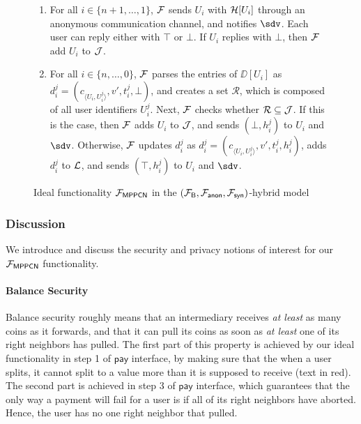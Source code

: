 \begin{figure*}[!t]
{{\begin{enumerate}
	\item For all $i \in \{n+1,\ldots,1\}$, $\mathcal{F}$ sends $U_i$ with $\mathcal{H}[U_i]$ through an 
	anonymous communication channel, and notifies $\sdv$. Each user can reply either with 
	$\top$ or $\bot$. If $U_i$ replies with $\bot$, then $\mathcal{F}$ add $U_i$ to $\mathcal{J}$.
	
	\item For all $i \in \{n,\ldots,0\}$, $\mathcal{F}$ parses the entries of $\DD[U_i]$ as 
	$d_i^j = (c_{\langle U_i,U_i^j \rangle}, v', t_i^j, \bot)$, and creates a set 
	$\mathcal{R}$, which is composed of all user identifiers $U_i^j$. Next, $\mathcal{F}$ checks 
	whether $\mathcal{R} \subseteq \mathcal{J}$. If this is the case, then $\mathcal{F}$ adds $U_i$ to $\mathcal{J}$, 
	and sends $(\bot, h_i^j)$ to $U_i$ and $\sdv$. Otherwise, $\mathcal{F}$ updates $d_i^j$ as 
	$d_i^j = (c_{\langle U_i,U_i^j \rangle}, v', t_i^j, h_i^j)$, adds $d_i^j$ to $\mathcal{L}$, and 
	sends $(\top, h_i^j)$ to $U_i$ and $\sdv$.
\end{enumerate}
}}

\caption{Ideal functionality $\mathcal{F}_{\mathsf{MPPCN}}$ in the 
$(\mathcal{F}_{\mathsf{B}}, \mathcal{F}_{\mathsf{anon}}, \mathcal{F}_{\mathsf{syn}})$-hybrid model}
\label{fig:ideal-mppcn}
\end{figure*}

\subsubsection{Discussion}
\label{sec:mppcn-discussion}

We introduce and discuss the security and privacy notions of interest for our 
$\mathcal{F}_{\mathsf{MPPCN}}$ functionality.

\paragraph{Balance Security}
Balance security roughly means that an intermediary receives \emph{at least} as many coins as 
it forwards, and that it can pull its coins as soon as \emph{at least} one of its right 
neighbors has pulled. The first part of this property is achieved by our ideal functionality 
in step 1 of $\mathsf{pay}$ interface, by making sure that the when a user splits, it cannot 
split to a value more than it is supposed to receive (text in red). The second part is achieved 
in step 3 of $\mathsf{pay}$ interface, which guarantees that the only way a payment will fail 
for a user is if all of its right neighbors have aborted. Hence, the user has no one right 
neighbor that pulled.

